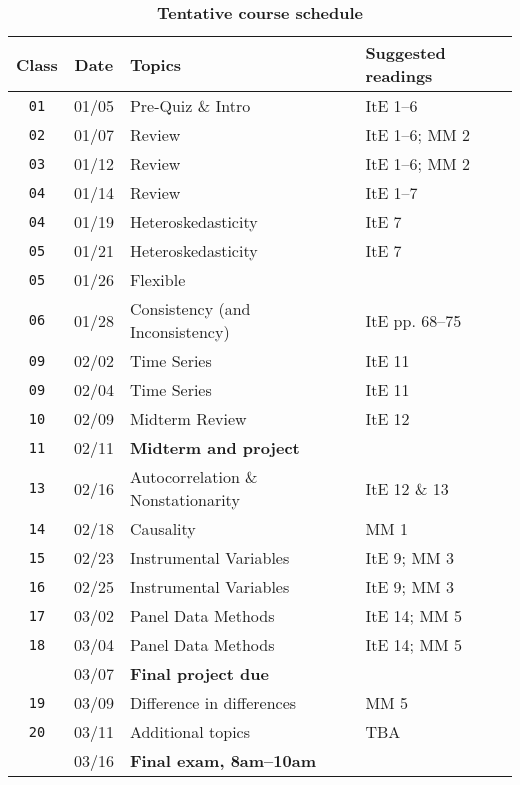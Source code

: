 \documentclass[10pt]{article}
\newcommand{\ra}[1]{\renewcommand{\arraystretch}{#1}}
\begin{document}
\begin{table}[htb]
  \centering
  \caption*{\textbf{Tentative course schedule}}
  \ra{1.5}
  \begin{tabular}{@{\extracolsep{1cm}} c c l l @{}}
    \toprule
    \textbf{Class} & \textbf{Date} & \textbf{Topics} & \textbf{Suggested readings}  \\ \toprule
    \texttt{01} & 01/05 & Pre-Quiz \& Intro & ItE 1--6 \\
    \texttt{02} & 01/07 & Review & ItE 1--6; MM 2 \\
    \texttt{03} & 01/12 & Review & ItE 1--6; MM 2 \\
    \texttt{04} & 01/14 & Review & ItE 1--7 \\
    \texttt{04} & 01/19 & Heteroskedasticity & ItE 7 \\
    \texttt{05} & 01/21 & Heteroskedasticity & ItE 7 \\
    \texttt{05} & 01/26 & Flexible \\
    \texttt{06} & 01/28 & Consistency (and Inconsistency) & ItE pp. 68--75  \\
    \texttt{09} & 02/02 & Time Series & ItE 11  \\
    \texttt{09} & 02/04 & Time Series & ItE 11  \\
    \texttt{10} & 02/09 & Midterm Review & ItE 12 \\ \midrule
    \texttt{11} & 02/11 & \textbf{Midterm and project} \\ \midrule
    \texttt{13} & 02/16 & Autocorrelation \& Nonstationarity & ItE 12 \& 13 \\
    \texttt{14} & 02/18 & Causality & MM 1 \\
    \texttt{15} & 02/23 & Instrumental Variables & ItE 9; MM 3 \\
    \texttt{16} & 02/25 & Instrumental Variables & ItE 9; MM 3 \\
    \texttt{17} & 03/02 & Panel Data Methods & ItE 14; MM 5 \\
    \texttt{18} & 03/04 & Panel Data Methods & ItE 14; MM 5 \\
    \texttt{  } & 03/07 & \textbf{Final project due} & \\
    \texttt{19} & 03/09 & Difference in differences & MM 5 \\
    \texttt{20} & 03/11 & Additional topics & TBA \\ \midrule
    \texttt{  } & 03/16 & \textbf{Final exam, 8am--10am} & \\
    \bottomrule
  \end{tabular}
\end{table}
\end{document}
